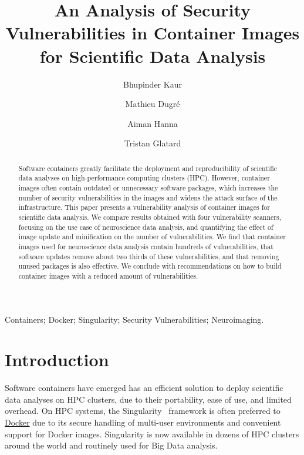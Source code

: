 \documentclass[a4paper,num-refs]{oup-contemporary}
\title{An Analysis of Security Vulnerabilities in Container Images for Scientific Data Analysis}
\begin{document}
\author{Bhupinder Kaur}
\author{Mathieu Dugr\'e}
\author{Aiman Hanna}
\author{Tristan Glatard}


\maketitle

\begin{abstract}
Software containers greatly facilitate the deployment and reproducibility
of scientific data analyses on high-performance computing clusters
(HPC). However, container images often contain outdated or unnecessary
software packages, which increases the number of security vulnerabilities
in the images and widens the attack surface of the infrastructure. This
paper presents a vulnerability analysis of container images for scientific
data analysis. We compare results obtained with four vulnerability
scanners, focusing on the use case of neuroscience data analysis, and
quantifying the effect of image update and minification on the number of
vulnerabilities. We find that container images used for neuroscience data analysis
contain hundreds of vulnerabilities, that software updates remove about two
thirds of these vulnerabilities, and that removing unused packages is also
effective. We conclude with recommendations on how to build container
images with a reduced amount of vulnerabilities.

\end{abstract}

\begin{keywords}
Containers; Docker; Singularity; Security Vulnerabilities; Neuroimaging.
\end{keywords}

\section{Introduction}

Software containers have emerged has an efficient solution to deploy
scientific data analyses on HPC clusters, due
to their portability, ease of use, and limited overhead. On HPC systems, the
Singularity~\cite{kurtzer2017singularity} framework is often preferred to
\href{http://docker.com}{Docker} due to its
secure handling of multi-user environments and convenient support for
Docker images. Singularity is now available in dozens of HPC
clusters around the world and routinely used for Big Data analysis.
\end{document}
